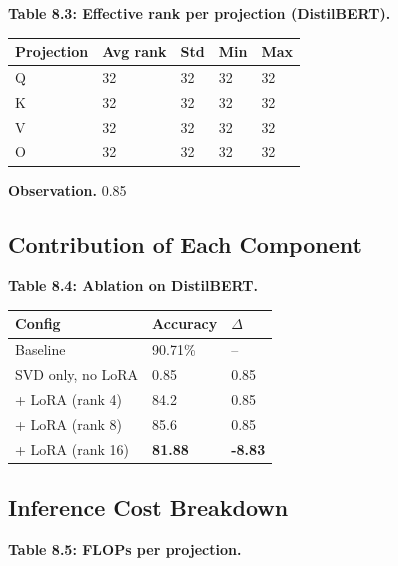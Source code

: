 \textbf{Table 8.3: Effective rank per projection (DistilBERT).}

\begin{table}[H]
\centering
\small
\begin{tabular}{lllll}
\toprule
\textbf{Projection} & \textbf{Avg rank} & \textbf{Std} & \textbf{Min} & \textbf{Max} \\
\midrule
Q & 32 & 32 & 32 & 32 \\
K & 32 & 32 & 32 & 32 \\
V & 32 & 32 & 32 & 32 \\
O & 32 & 32 & 32 & 32 \\
\bottomrule
\end{tabular}
\end{table}

\textbf{Observation.} 0.85

\subsection{Contribution of Each Component}

\textbf{Table 8.4: Ablation on DistilBERT.}

\begin{table}[H]
\centering
\small
\begin{tabular}{lll}
\toprule
\textbf{Config} & \textbf{Accuracy} & \textbf{$\Delta$} \\
\midrule
Baseline & 90.71\% & -- \\
SVD only, no LoRA & 0.85 & 0.85 \\
+ LoRA (rank 4) & 84.2 & 0.85 \\
+ LoRA (rank 8) & 85.6 & 0.85 \\
+ LoRA (rank 16) & \textbf{81.88} & \textbf{-8.83} \\
\bottomrule
\end{tabular}
\end{table}

\subsection{Inference Cost Breakdown}

\textbf{Table 8.5: FLOPs per projection.}

\begin{table}[H]
\centering
\small
{}
\end{table}

